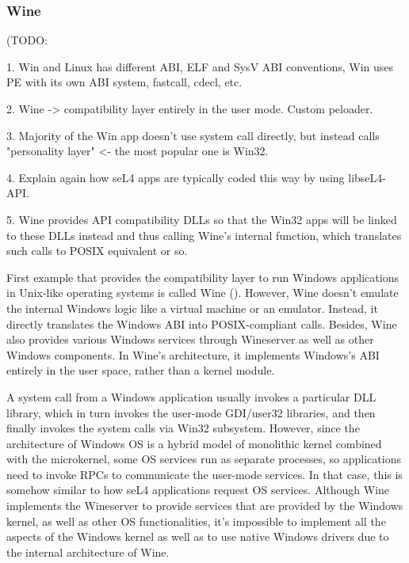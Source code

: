 \subsubsection{Wine}


(TODO: 

1. Win and Linux has different ABI, ELF and SysV ABI conventions, Win uses PE with its own ABI system, fastcall, cdecl, etc. 

2. Wine -> compatibility layer entirely in the user mode. Custom peloader.

3. Majority of the Win app doesn't use system call directly,  but instead calls "personality layer" <- the most popular one is Win32. 

4. Explain again how seL4 apps are typically coded this way by using libseL4-API. 

5. Wine provides API compatibility DLLs so that the Win32 apps will be linked to these DLLs instead and thus calling Wine's internal function, which translates such calls to POSIX equivalent or so. 

First example that provides the compatibility layer to run Windows applications in Unix-like operating systems is called Wine (\cite{enwikiWine}). However, Wine doesn't emulate the internal Windows logic like a virtual machine or an emulator. Instead, it directly translates the Windows ABI into POSIX-compliant calls. Besides, Wine also provides various Windows services through Wineserver as well as other Windows components. In Wine's architecture, it implements Windows's ABI entirely in the user space, rather than a kernel module. 

A system call from a Windows application usually invokes a particular DLL library, which in turn invokes the user-mode GDI/user32 libraries, and then finally invokes the system calls via Win32 subsystem. However, since the architecture of Windows OS is a hybrid model of monolithic kernel combined with the microkernel, some OS services run as separate processes, so applications need to invoke RPCs to communicate the user-mode services. In that case, this is somehow similar to how seL4 applications request OS services. Although Wine implements the Wineserver to provide services that are provided by the Windows kernel, as well as other OS functionalities, it's impossible to implement all the aspects of the Windows kernel as well as to use native Windows drivers due to the internal architecture of Wine. 

